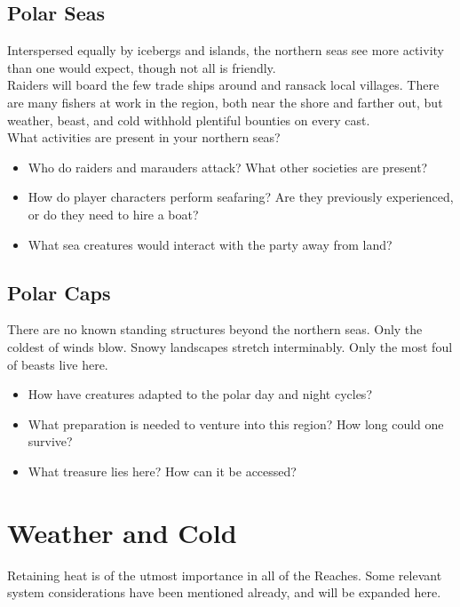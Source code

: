 \documentclass[notitlepage]{article}
\begin{document}
\begin{multicols}{2}
\subsection*{Polar Seas}

Interspersed equally by icebergs and islands, the northern seas see more activity than one would expect, though not all is friendly. \\

Raiders will board the few trade ships around and ransack local villages. There are many fishers at work in the region, both near the shore and farther out, but weather, beast, and cold withhold plentiful bounties on every cast. \\

What activities are present in your northern seas?

\begin{itemize}
\item Who do raiders and marauders attack? What other societies are present?
\item How do player characters perform seafaring? Are they previously experienced, or do they need to hire a boat?
\item What sea creatures would interact with the party away from land?
\end{itemize}

\subsection*{Polar Caps}

There are no known standing structures beyond the northern seas. Only the coldest of winds blow. Snowy landscapes stretch interminably. Only the most foul of beasts live here.

\begin{itemize}
\item How have creatures adapted to the polar day and night cycles?
\item What preparation is needed to venture into this region? How long could one survive?
\item What treasure lies here? How can it be accessed?
\end{itemize}

\section{Weather and Cold}

Retaining heat is of the utmost importance in all of the Reaches.
Some relevant system considerations have been mentioned already, and will be expanded here. \\


\end{multicols}
\end{document}

